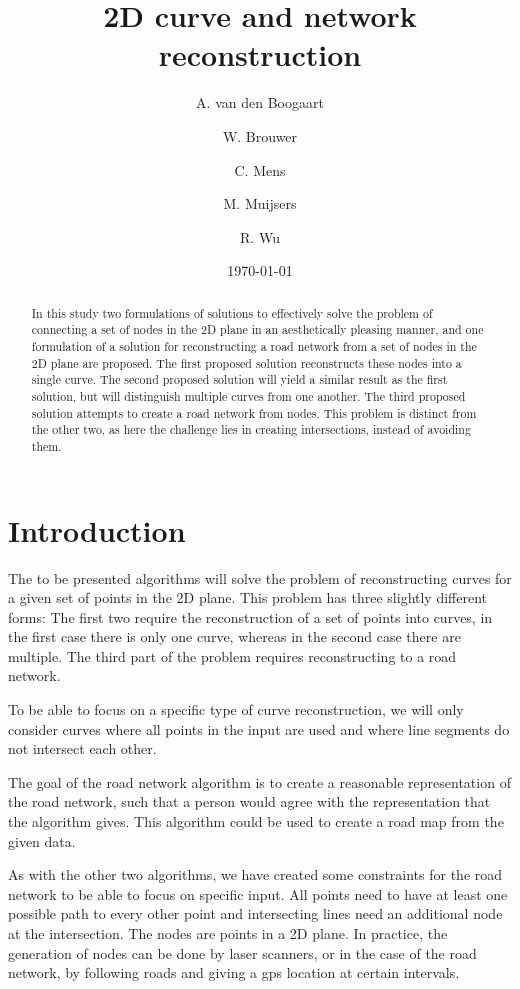 \documentclass[11pt]{article}
\title{2D curve and network reconstruction}
\author{
A. van den Boogaart \and
W. Brouwer \and
C. Mens \and
M. Muijsers \and
R. Wu
}
\date{\today}
\begin{document}
\newpage

\maketitle

\begin{abstract}
In this study  two formulations of solutions to effectively solve the problem of connecting a set of nodes in the 2D plane in an aesthetically pleasing manner, and one formulation of a solution for reconstructing a road network from a set of nodes in the 2D plane are proposed.
The first proposed solution reconstructs these nodes into a single curve.
The second proposed solution will yield a similar result as the first solution, but will distinguish multiple curves from one another.
The third proposed solution attempts to create a road network from nodes. This problem is distinct from the other two, as here the challenge lies in creating intersections, instead of avoiding them.

\end{abstract}

\section{Introduction}
\label{se:introduction}
The to be presented algorithms will solve the problem of reconstructing curves for a given set of points in the 2D plane. This problem has three slightly different forms: The first two require the reconstruction of a set of points into curves, in the first case there is only one curve, whereas in the second case there are multiple. The third part of the problem requires reconstructing to a road network.

To be able to focus on a specific type of curve reconstruction, we will only consider curves where all points in the input are used and where line segments do not intersect each other.

The goal of the road network algorithm is to create a reasonable representation of the road network, such that a person would agree with the representation that the algorithm gives. This algorithm could be used to create a road map from the given data.

As with the other two algorithms, we have created some constraints for the road network to be able to focus on specific input. All points need to have at least one possible path to every other point and intersecting lines need an additional node at the intersection. The nodes are points in a 2D plane. In practice, the generation of nodes can be done by laser scanners, or in the case of the road network, by following roads and giving a gps location at certain intervals.
\end{document}
